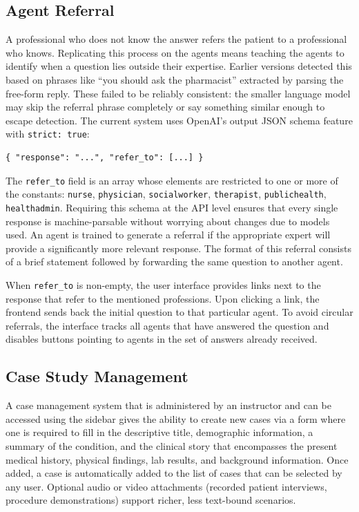 \documentclass[pdflatex,sn-mathphys-num]{sn-jnl}
\theoremstyle{thmstyleone}
\theoremstyle{thmstyletwo}
\theoremstyle{thmstylethree}
\begin{document}
\subsection{Agent Referral}

A professional who does not know the answer refers the patient to a professional who knows. Replicating this process on the agents means teaching the agents to identify when a question lies outside their expertise. Earlier versions detected this based on phrases like “you should ask the pharmacist” extracted by parsing the free-form reply. These failed to be reliably consistent: the smaller language model may skip the referral phrase completely or say something similar enough to escape detection. The current system uses OpenAI’s output JSON schema feature with \texttt{strict: true}:

\begin{lstlisting}
{ "response": "...", "refer_to": [...] }
\end{lstlisting}

The \texttt{refer\_to} field is an array whose elements are restricted to one or more of the constants: \texttt{nurse}, \texttt{physician}, \texttt{socialworker}, \texttt{therapist}, \texttt{publichealth}, \texttt{healthadmin}. Requiring this schema at the API level ensures that every single response is machine-parsable without worrying about changes due to models used. An agent is trained to generate a referral if the appropriate expert will provide a significantly more relevant response. The format of this referral consists of a brief statement followed by forwarding the same question to another agent.

When \texttt{refer\_to} is non-empty, the user interface provides links next to the response that refer to the mentioned professions. Upon clicking a link, the frontend sends back the initial question to that particular agent. To avoid circular referrals, the interface tracks all agents that have answered the question and disables buttons pointing to agents in the set of answers already received.

\subsection{Case Study Management}

A case management system that is administered by an instructor and can be accessed using the sidebar gives the ability to create new cases via a form where one is required to fill in the descriptive title, demographic information, a summary of the condition, and the clinical story that encompasses the present medical history, physical findings, lab results, and background information. Once added, a case is automatically added to the list of cases that can be selected by any user. Optional audio or video attachments (recorded patient interviews, procedure demonstrations) support richer, less text-bound scenarios.
\end{document}
